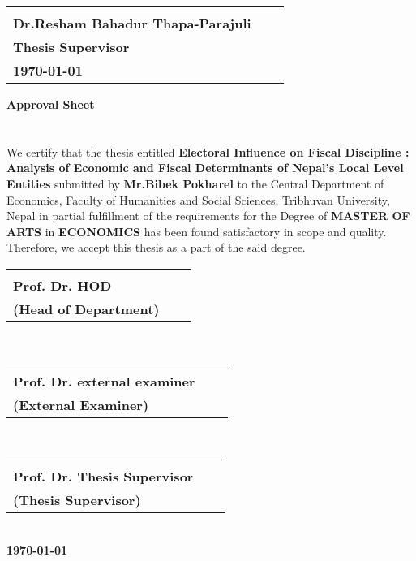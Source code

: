 \begin{tabular}{@{}p{3in}p{2in}p{2in}@{}}
\hrulefill \\
\textbf{Dr.Resham Bahadur Thapa-Parajuli} &&\\
\textbf{Thesis Supervisor} &&\\
\textbf{\today}\\
\end{tabular}


\newpage
\begin{center}
\textbf{\large Approval Sheet}
\end{center}
\section*{}

\vspace{-10mm}We certify that the thesis entitled \textbf{Electoral Influence on Fiscal Discipline : Analysis of  Economic and Fiscal Determinants of Nepal's Local Level Entities} submitted by \textbf{Mr.Bibek Pokharel} to the Central Department of Economics, Faculty of Humanities
and Social Sciences, Tribhuvan University, Nepal in partial fulfillment of the requirements
for the Degree of \textbf{MASTER OF ARTS} in \textbf{ECONOMICS} has been found satisfactory in
scope and quality. Therefore, we accept this thesis as a part of the said degree.\vspace{15mm}\\

\begin{tabular}{@{}p{2.5in}p{2in}p{2in}@{}}
\hrulefill \\
\textbf{Prof. Dr. HOD} &&\\
\textbf{(Head of Department)} &&\\
\end{tabular}\vspace{15mm}\\

\begin{tabular}{@{}p{2.5in}p{2in}p{2in}@{}}
\hrulefill \\
\textbf{Prof. Dr. external examiner} &&\\
\textbf{(External Examiner)} &&\\
\end{tabular}\vspace{15mm}\\

\begin{tabular}{@{}p{2.5in}p{2in}p{2in}@{}}\hrulefill \\
\textbf{Prof. Dr. Thesis Supervisor} &&\\
\textbf{(Thesis Supervisor)} &&\\
\end{tabular}\vspace{15mm}\\
\hspace{3mm}\textbf{\today}


